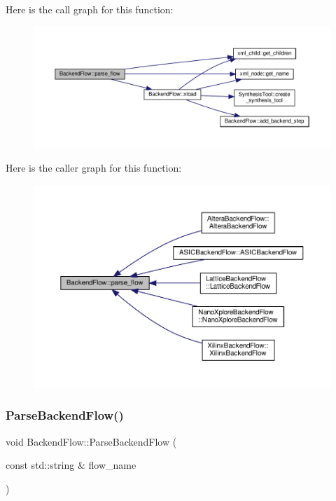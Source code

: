 Here is the call graph for this function\+:
\nopagebreak
\begin{figure}[H]
\begin{center}
\leavevmode
\includegraphics[width=350pt]{da/d75/classBackendFlow_a70e196e669a5be2bc954b4aec6852add_cgraph}
\end{center}
\end{figure}
Here is the caller graph for this function\+:
\nopagebreak
\begin{figure}[H]
\begin{center}
\leavevmode
\includegraphics[width=350pt]{da/d75/classBackendFlow_a70e196e669a5be2bc954b4aec6852add_icgraph}
\end{center}
\end{figure}
\mbox{\label{classBackendFlow_a83d8f5d29a20cf79338d224839af5912}} 
\subsubsection{\texorpdfstring{Parse\+Backend\+Flow()}{ParseBackendFlow()}}
{\footnotesize\ttfamily void Backend\+Flow\+::\+Parse\+Backend\+Flow (\begin{DoxyParamCaption}\item[{const std\+::string \&}]{flow\+\_\+name }\end{DoxyParamCaption})\hspace{0.3cm}{\ttfamily [protected]}}




